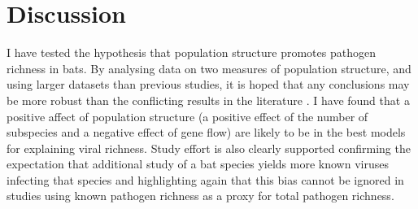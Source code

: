 



\section{Discussion}  



I have tested the hypothesis that population structure promotes pathogen richness in bats.
By analysing data on two measures of population structure, and using larger datasets than previous studies, it is hoped that any conclusions may be more robust than the conflicting results in the literature \cite{gay2014parasite, turmelle2009correlates, maganga2014bat}.
I have found that a positive affect of population structure (a positive effect of the number of subspecies and a negative effect of gene flow) are likely to be in the best models for explaining viral richness.
Study effort is also clearly supported confirming the expectation that additional study of a bat species yields more known viruses infecting that species and highlighting again that this bias cannot be ignored in studies using known pathogen richness as a proxy for total pathogen richness.


